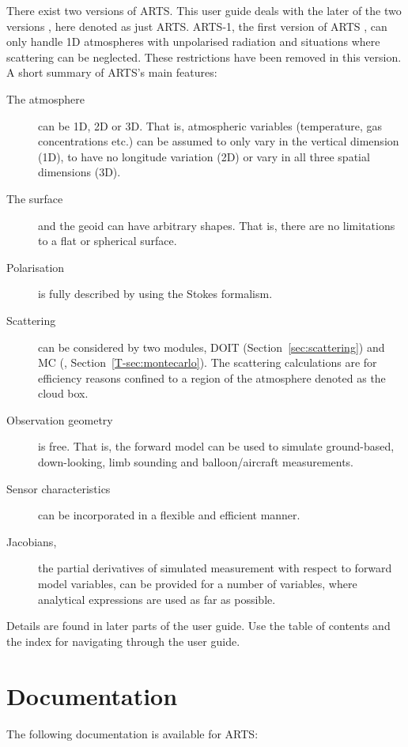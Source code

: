 There exist two versions of ARTS. This user guide deals with the later of the
two versions \citep{eriksson:arts2:11}, here denoted as just ARTS. ARTS-1, the
first version of ARTS \citep{buehler:artst:05}, can only handle 1D atmospheres
with unpolarised radiation and situations where scattering can be neglected.
These restrictions have been removed in this version. A short summary of ARTS's
main features:
\begin{description}
\item[The atmosphere] can be 1D, 2D or 3D. That is, atmospheric
  variables (temperature, gas concentrations etc.) can be assumed to
  only vary in the vertical dimension (1D), to have no longitude
  variation (2D) or vary in all three spatial dimensions (3D).
\item[The surface] and the geoid can have arbitrary shapes. That is,
  there are no limitations to a flat or spherical surface.
\item[Polarisation] is fully described by using the Stokes formalism.
\item[Scattering] can be considered by two modules, DOIT
  (Section~\ref{sec:scattering}) and MC
  (\theory, Section~\ref{T-sec:montecarlo}). The scattering calculations are for
  efficiency reasons confined to a region of the atmosphere denoted as
  the cloud box.
\item[Observation geometry] is free. That is, the forward model can be
  used to simulate ground-based, down-looking, limb sounding and
  balloon/aircraft measurements.
\item[Sensor characteristics] can be incorporated in a flexible and
  efficient manner.
\item[Jacobians,] the partial derivatives of simulated measurement
  with respect to forward model variables, can be provided for a
  number of variables, where analytical expressions are used as far as
  possible.
\end{description}
Details are found in later parts of the user guide. Use the table of
contents and the index for navigating through the user guide.



\section{Documentation}
\label{sec:concept:doc}

The following documentation is available for ARTS:

